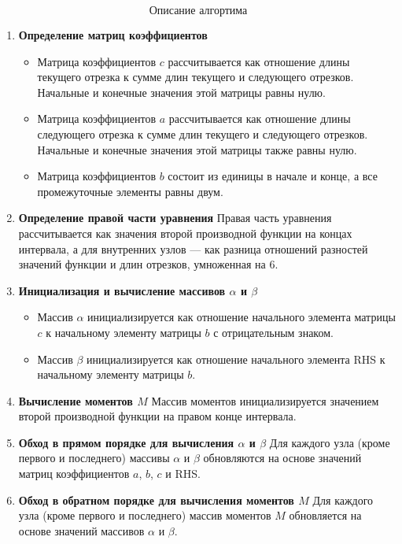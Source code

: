 \documentclass{article}
\begin{document}
$$\textbf{Описание алгортима}$$

\begin{enumerate}
    \item \textbf{Определение матриц коэффициентов}
    \begin{itemize}
        \item Матрица коэффициентов \( c \) рассчитывается как отношение длины текущего отрезка к сумме длин текущего и следующего отрезков. Начальные и конечные значения этой матрицы равны нулю.
        \item Матрица коэффициентов \( a \) рассчитывается как отношение длины следующего отрезка к сумме длин текущего и следующего отрезков. Начальные и конечные значения этой матрицы также равны нулю.
        \item Матрица коэффициентов \( b \) состоит из единицы в начале и конце, а все промежуточные элементы равны двум.
    \end{itemize}
    
    \item \textbf{Определение правой части уравнения}
    Правая часть уравнения рассчитывается как значения второй производной функции на концах интервала, а для внутренних узлов — как разница отношений разностей значений функции и длин отрезков, умноженная на 6.

    \item \textbf{Инициализация и вычисление массивов \( \alpha \) и \( \beta \)}
    \begin{itemize}
        \item Массив \( \alpha \) инициализируется как отношение начального элемента матрицы \( c \) к начальному элементу матрицы \( b \) с отрицательным знаком.
        \item Массив \( \beta \) инициализируется как отношение начального элемента RHS к начальному элементу матрицы \( b \).
    \end{itemize}

    \item \textbf{Вычисление моментов \( M \)}
    Массив моментов инициализируется значением второй производной функции на правом конце интервала.

    \item \textbf{Обход в прямом порядке для вычисления \( \alpha \) и \( \beta \)}
    Для каждого узла (кроме первого и последнего) массивы \( \alpha \) и \( \beta \) обновляются на основе значений матриц коэффициентов \( a \), \( b \), \( c \) и RHS.

    \item \textbf{Обход в обратном порядке для вычисления моментов \( M \)}
    Для каждого узла (кроме первого и последнего) массив моментов \( M \) обновляется на основе значений массивов \( \alpha \) и \( \beta \).


\end{enumerate}
\end{document}

